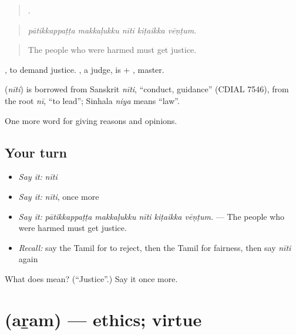 \begin{quote}
    .
\end{quote}

\begin{quote}
\emph{pātikkappaṭṭa makkaḷukku nīti kiṭaikka vēṇṭum.}
\end{quote}

\begin{quote}
The people who were harmed must get justice.
\end{quote}

 , to demand justice. , a judge, is  + , master.

\begin{cousinweb}
\textbf{} (\emph{nīti}) is borrowed from Sanskrit \emph{nīti}, \textquotedblleft{}conduct, guidance\textquotedblright{} (CDIAL 7546), from the root \emph{nī}, \textquotedblleft{}to lead\textquotedblright{}; Sinhala \emph{niya} means \textquotedblleft{}law\textquotedblright{}.
\end{cousinweb}

\begin{grammarlens}[title={What you've built}]
One more word for giving reasons and opinions.
\end{grammarlens}

\subsection*{Your turn}
\begin{itemize}
\raggedright
  \item \emph{Say it:} \emph{nīti}
  \item \emph{Say it:} \emph{nīti}, once more
  \item \emph{Say it:} \emph{pātikkappaṭṭa makkaḷukku nīti kiṭaikka vēṇṭum.} — The people who were harmed must get justice.
  \item \emph{Recall:} say the Tamil for to reject, then the Tamil for fairness, then say \emph{nīti} again
\end{itemize}

\begin{tcolorbox}[breakable,colback=teal!4,colframe=teal!35!black,title={Before you move on}]
What does  mean? (\textquotedblleft{}Justice\textquotedblright{}.) Say it once more.
\end{tcolorbox}
\section[\texorpdfstring{\ta{அறம்} (aṟam)}{அறம் (aṟam)}]{ (aṟam) — ethics; virtue}

